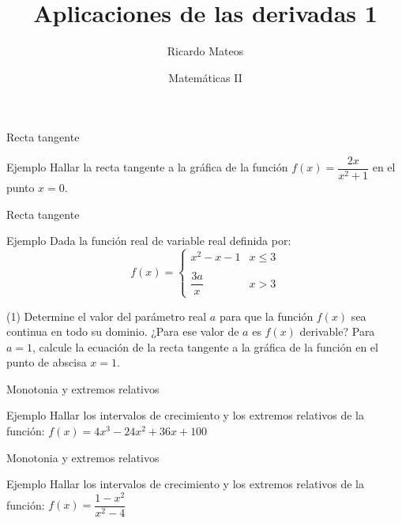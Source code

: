 \documentclass[8pt]{beamer}
\title{Aplicaciones de las derivadas 1}
\author{Ricardo Mateos}
\institute[UHEI-IVED]{Departamento de Matemáticas \\ UHEI - IVED}
\date{Matemáticas II}
\begin{document}
\begin{frame}
\maketitle
\end{frame}

\begin{frame}
\tableofcontents
\end{frame}

\begin{frame}[t]{Recta tangente}
\begin{exampleblock}{Ejemplo}
Hallar la recta tangente a la gráfica de la función $f(x)=\dfrac{2x}{x^2+1}$ en el punto $x=0$.
\end{exampleblock}
\end{frame}

\begin{frame}[t]{Recta tangente}
\begin{exampleblock}{Ejemplo}
Dada la función real de variable real definida por:
\[ f(x)= \begin{cases} x^2-x-1 & x \leq 3 \\ \\ \dfrac{3a}{x} & x>3 \end{cases} \]
\begin{tasks}[label=\alph*)](1)
\task Determine el valor del parámetro real $a$ para que la función $f(x)$ sea continua en todo su dominio. ¿Para ese valor de $a$ es $f(x)$ derivable?
\task Para $a = 1$, calcule la ecuación de la recta tangente a la gráfica de la función en el punto de abscisa $x = 1$.
\end{tasks}

\end{exampleblock}
\end{frame}

\begin{frame}[t]{Monotonia y extremos relativos}
\begin{exampleblock}{Ejemplo}
Hallar los intervalos de crecimiento y los extremos relativos de la función: $f(x)=4x^3-24x^2+36x+100$
\end{exampleblock}
\end{frame}

\begin{frame}[t]{Monotonia y extremos relativos}
\begin{exampleblock}{Ejemplo}
Hallar los intervalos de crecimiento y los extremos relativos de la función: $f(x)=\dfrac{1-x^2}{x^2-4}$
\end{exampleblock}
\end{frame}
\end{document}
